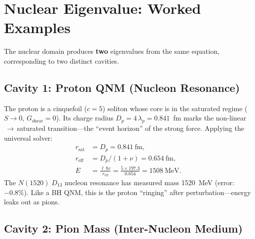 \section{Nuclear Eigenvalue: Worked Examples}
\label{sec:nuclear_eigenvalue}

The nuclear domain produces \textbf{two} eigenvalues from the same equation, corresponding to two distinct cavities.

\subsection{Cavity 1: Proton QNM (Nucleon Resonance)}

The proton is a cinquefoil ($c = 5$) soliton whose core is in the saturated regime ($S \to 0$, $G_\mathrm{shear} = 0$).  Its charge radius $D_p = 4\,\lambda_p = 0.841$~fm marks the non-linear$\,\to\,$saturated transition---the ``event horizon'' of the strong force.  Applying the universal solver:
\begin{align}
    r_\mathrm{sat} &= D_p = 0.841~\mathrm{fm}, \\
    r_\mathrm{eff} &= D_p / (1 + \nu) = 0.654~\mathrm{fm}, \\
    E &= \frac{\ell\,\hbar c}{r_\mathrm{eff}} = \frac{5 \times 197.3}{0.654} = 1508~\mathrm{MeV}.
\end{align}
The $N(1520)\;D_{13}$ nucleon resonance has measured mass 1520~MeV (error: $-0.8\%$).  Like a BH QNM, this is the proton ``ringing'' after perturbation---energy leaks out as pions.

\subsection{Cavity 2: Pion Mass (Inter-Nucleon Medium)}

